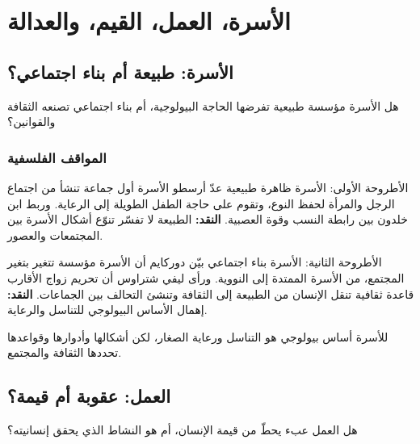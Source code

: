 \documentclass[12pt, twoside, openright]{book}
\newcommand{\setchap}[1]{\colorlet{chapcol}{#1}}
\begin{document}
\mainmatter

\setchap{colA}
\chapter{الأسرة، العمل، القيم، والعدالة}

\section{الأسرة: طبيعة أم بناء اجتماعي؟}
\begin{problembox}
هل الأسرة مؤسسة طبيعية تفرضها الحاجة البيولوجية، أم بناء اجتماعي تصنعه الثقافة والقوانين؟
\end{problembox}
\subsection*{المواقف الفلسفية}
\begin{positionbox}{الأطروحة الأولى: الأسرة ظاهرة طبيعية}
عدّ أرسطو الأسرة أول جماعة تنشأ من اجتماع الرجل والمرأة لحفظ النوع، وتقوم على حاجة الطفل الطويلة إلى الرعاية. وربط ابن خلدون بين رابطة النسب وقوة العصبية. \textbf{النقد:} الطبيعة لا تفسّر تنوّع أشكال الأسرة بين المجتمعات والعصور.
\end{positionbox}
\begin{positionbox}{الأطروحة الثانية: الأسرة بناء اجتماعي}
بيّن دوركايم أن الأسرة مؤسسة تتغير بتغير المجتمع، من الأسرة الممتدة إلى النووية. ورأى ليفي شتراوس أن تحريم زواج الأقارب قاعدة ثقافية تنقل الإنسان من الطبيعة إلى الثقافة وتنشئ التحالف بين الجماعات. \textbf{النقد:} إهمال الأساس البيولوجي للتناسل والرعاية.
\end{positionbox}
\begin{synthbox}
للأسرة أساس بيولوجي هو التناسل ورعاية الصغار، لكن أشكالها وأدوارها وقواعدها تحددها الثقافة والمجتمع.
\end{synthbox}

\section{العمل: عقوبة أم قيمة؟}
\begin{problembox}
هل العمل عبء يحطّ من قيمة الإنسان، أم هو النشاط الذي يحقق إنسانيته؟
\end{problembox}
\end{document}

